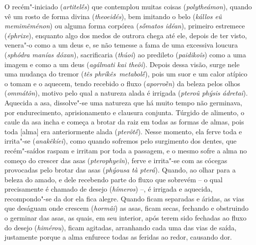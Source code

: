 \bekker{[251a]} O recém"-iniciado (\emph{artitelḗs}) que contemplou muitas
coisas (\emph{polytheámon}), quando vê um rosto de forma divina
(\emph{theoeidés}), bem imitando o belo (\emph{kállos eû memimêménon})
ou alguma forma corpórea (\emph{sṓmatos idéan}), primeiro estremece
(\emph{éphrixe}), enquanto algo dos medos de outrora chega até ele,
depois de ter visto, venera"-o como a um deus e, se não temesse a fama de
uma excessiva loucura (\emph{sphódra manías dóxan}), sacrificaria
(\emph{thúoi}) ao predileto (\emph{paidikoîs}) como a uma imagem e como
a um deus (\emph{agálmati kai theôi}). Depois dessa visão, surge nele
uma mudança do tremor (\emph{tês phríkês}~\emph{metabolḗ}), pois um suor
e um calor atípico o tomam e o aquecem, tendo recebido \bekker{[251b]} o fluxo
(\emph{aporroḕn}) da beleza pelos olhos (\emph{ommátôn}), motivo pelo
qual a natureza alada é irrigada (\emph{pteroû phýsis ádretai}).
Aquecida a asa, dissolve"-se uma natureza que há muito tempo não
germinava, por endurecimento, aprisionamento e clausura conjunta.
Túrgido de alimento, o caule da asa incha e começa a brotar da raiz em
todas as formas de almas, pois toda [alma] era anteriormente alada
(\emph{pterôtḗ}). Nesse momento, ela ferve toda e irrita"-se
(\emph{anakêkíei}), \bekker{[251c]} como quando sofremos pelo surgimento dos
dentes, que recém"-saídos raspam e irritam por toda a passagem, e o mesmo
sofre a alma no começo do crescer das asas (\emph{pterophyeîn}), ferve e
irrita"-se com as cócegas provocadas pelo brotar das asas (\emph{phýousa
tà pterá}). Quando, ao olhar para a beleza do amado, e dele recebendo
parte do fluxo que sobrevém -- o qual precisamente é chamado de desejo
(\emph{hímeros}) --, é irrigada e
aquecida, recompondo"-se da dor ela fica alegre. \bekker{[251d]} Quando ficam
separadas e áridas, as vias que deságuam onde crescem (\emph{hormâi}) as
asas, ficam secas, fechando e obstruindo o germinar das asas, as quais,
em seu interior, após terem sido fechadas ao fluxo do desejo
(\emph{himérou}), ficam agitadas, arranhando cada uma das vias de saída,
justamente porque a alma enfurece todas as feridas ao redor, causando
dor.

